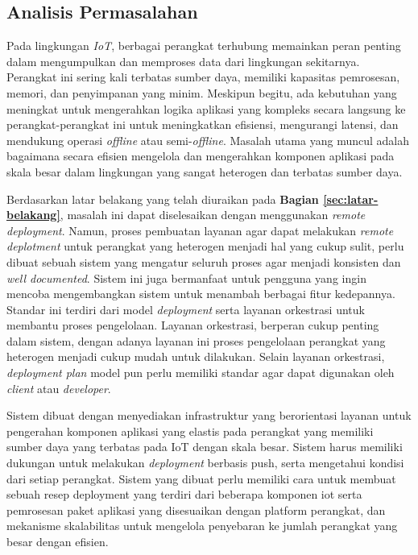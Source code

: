 \subsection{Analisis Permasalahan}
\label{sec:analisis-permasalahan}

Pada lingkungan \textit{IoT}, berbagai perangkat terhubung memainkan peran penting dalam mengumpulkan dan memproses data dari lingkungan sekitarnya. Perangkat ini sering kali terbatas sumber daya, memiliki kapasitas pemrosesan, memori, dan penyimpanan yang minim. Meskipun begitu, ada kebutuhan yang meningkat untuk mengerahkan logika aplikasi yang kompleks secara langsung ke perangkat-perangkat ini untuk meningkatkan efisiensi, mengurangi latensi, dan mendukung operasi \textit{offline} atau semi-\textit{offline}. Masalah utama yang muncul adalah bagaimana secara efisien mengelola dan mengerahkan komponen aplikasi pada skala besar dalam lingkungan yang sangat heterogen dan terbatas sumber daya.

Berdasarkan latar belakang yang telah diuraikan pada \textbf{Bagian \ref{sec:latar-belakang}}, masalah ini dapat diselesaikan dengan menggunakan \textit{remote deployment}. Namun, proses pembuatan layanan agar dapat melakukan \textit{remote deplotment} untuk perangkat yang heterogen menjadi hal yang cukup sulit, perlu dibuat sebuah sistem yang mengatur seluruh proses agar menjadi konsisten dan \textit{well documented}. Sistem ini juga bermanfaat untuk pengguna yang ingin mencoba mengembangkan sistem untuk menambah berbagai fitur kedepannya. Standar ini terdiri dari model \textit{deployment} serta layanan orkestrasi untuk membantu proses pengelolaan. Layanan orkestrasi, berperan cukup penting dalam sistem, dengan adanya layanan ini proses pengelolaan perangkat yang heterogen menjadi cukup mudah untuk dilakukan. Selain layanan orkestrasi, \textit{deployment plan} model pun perlu memiliki standar agar dapat digunakan oleh \textit{client} atau \textit{developer}.

Sistem dibuat dengan menyediakan infrastruktur yang berorientasi layanan untuk pengerahan komponen aplikasi yang elastis pada perangkat yang memiliki sumber daya yang terbatas pada IoT dengan skala besar. Sistem harus memiliki dukungan untuk melakukan \textit{deployment} berbasis push, serta mengetahui kondisi dari setiap perangkat. Sistem yang dibuat perlu memiliki cara untuk membuat sebuah resep deployment yang terdiri dari beberapa komponen iot serta
pemrosesan paket aplikasi yang disesuaikan dengan platform perangkat, dan mekanisme skalabilitas untuk mengelola penyebaran ke jumlah perangkat yang besar dengan efisien.

